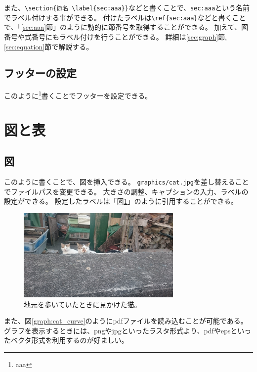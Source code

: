 \documentclass[uplatex, a4paper,twocolumn, 14pt]{jsarticle}
\begin{document}
また、\verb|\section{節名 \label{sec:aaa}}|などと書くことで、\verb|sec:aaa|という名前でラベル付けする事ができる。
付けたラベルは\verb|\ref{sec:aaa}|などと書くことで、「\ref{sec:aaa}節」のように動的に節番号を取得することができる。
加えて、図番号や式番号にもラベル付けを行うことができる。
詳細は\ref{sec:graph}節, \ref{sec:equation}節で解説する。

\subsection{フッターの設定}
このように\footnote{aaa}書くことでフッターを設定できる。


\section{図と表}

\subsection{図 \label{sec:graph}}

このように書くことで、図を挿入できる。
\verb|graphics/cat.jpg|を差し替えることでファイルパスを変更できる。
大きさの調整、キャプションの入力、ラベルの設定ができる。
設定したラベルは「図\ref{graph:cat}」のように引用することができる。

\begin{figure}[tbh]
    \begin{center}
        \includegraphics[width=8cm]{graphics/cat.jpg}
        \caption{
            地元を歩いていたときに見かけた猫。
        }
        \label{graph:cat}
    \end{center}
\end{figure}

また、図\ref{graph:cat_curve}のようにpdfファイルを読み込むことが可能である。
グラフを表示するときには、pngやjpgといったラスタ形式より、pdfやepsといったベクタ形式を利用するのが好ましい。
\end{document}
